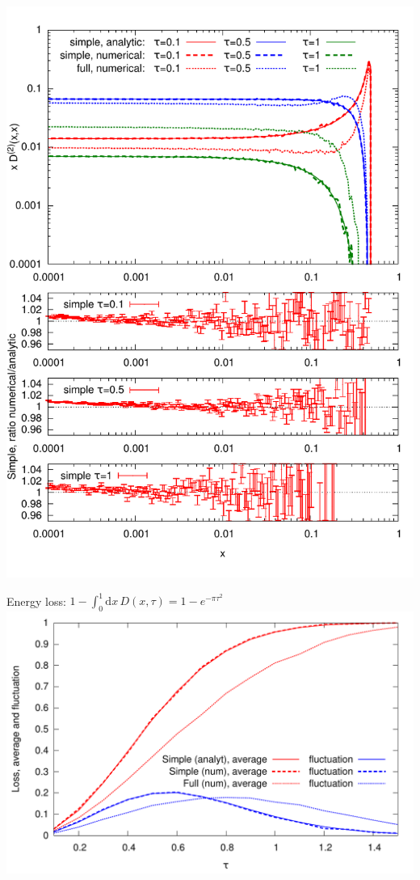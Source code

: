 \documentclass[pstricks,mathserif]{beamer}
\begin{document}
\begin{frame}
\includegraphics[width=1\linewidth]{D2.pdf}
\endminipage\hfill


\end{frame}



\begin{frame}
Energy loss: $1 - \int_0^1 \mathrm{d}x\, D(x,\tau) = 1 - e^{-\pi\tau^2}$
{\centering
\includegraphics[width=1\linewidth]{energyloss.pdf}
}
\end{frame}
\end{document}
